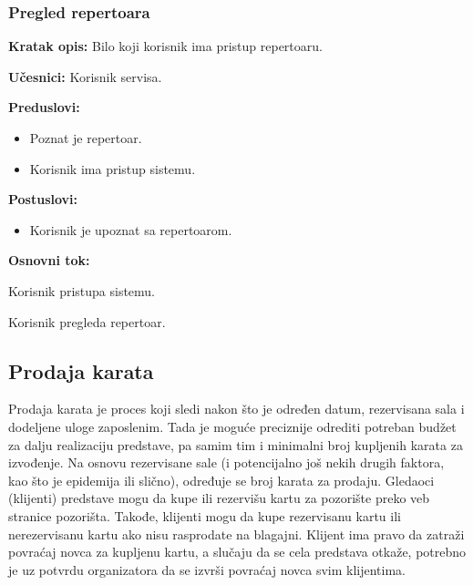 \documentclass[a4paper]{article}
\begin{document}
\subsubsection{Pregled repertoara} 
\noindent\textbf{Kratak opis:} Bilo koji korisnik ima pristup repertoaru.

\noindent\textbf{Učesnici:} Korisnik servisa.

\noindent\textbf{Preduslovi:}
  \begin{itemize}
    \item Poznat je repertoar.
    \item Korisnik ima pristup sistemu.
  \end{itemize}

\noindent\textbf{Postuslovi:} 
  \begin{itemize}
    \item Korisnik je upoznat sa repertoarom.
  \end{itemize}

\noindent\textbf{Osnovni tok:}
  \begin{legal}
    \item Korisnik pristupa sistemu.
    \item Korisnik pregleda repertoar.
  \end{legal}



\newpage
\subsection{Prodaja karata}
Prodaja karata je proces koji sledi nakon što je određen datum, rezervisana sala i dodeljene uloge
zaposlenim. Tada je moguće preciznije odrediti potreban budžet za dalju realizaciju predstave, pa
samim tim i minimalni broj kupljenih karata za izvođenje. Na osnovu rezervisane sale (i potencijalno još 
nekih drugih faktora, kao što je epidemija ili slično), određuje se broj karata za prodaju. Gledaoci 
(klijenti) predstave mogu da kupe ili rezervišu kartu za pozorište preko veb stranice pozorišta. 
Takođe, klijenti mogu da kupe rezervisanu kartu ili nerezervisanu kartu ako nisu rasprodate na blagajni.
Klijent ima pravo da zatraži povraćaj novca za kupljenu kartu, a slučaju da se cela predstava otkaže,
potrebno je uz potvrdu organizatora da se izvrši povraćaj novca svim klijentima.
\end{document}
